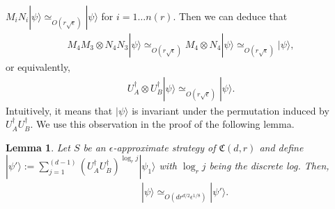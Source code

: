 \documentclass[11pt,letterpaper]{article}
\newcommand{\ket}[1]{|#1\rangle}
\newcommand{\x}{\otimes}
\newcommand{\ct}{^{\dagger}}
\newcommand{\1}{\mathbb{1}}
\newcommand{\nr}{n(r)}
\newcommand{\fC}{\mathfrak{C}}
\newcommand{\ep}{\epsilon}
\newcommand{\se}{\sqrt{\epsilon}}
\newcommand{\appd}[1]{\simeq_{#1}}
\newtheorem{lemma}[theorem]{Lemma}
\theoremstyle{definition}
\begin{document}
$M_iN_i \ket{\psi} \appd{O(r\se)} \ket{\psi}$ for $i = 1 \dots \nr$.
Then we can deduce that 
\begin{align*}
	M_4M_3 \x N_4N_3 \ket{\psi} \appd{O(r\se)} M_4 \x N_4 \ket{\psi} \appd{O(r\se)} \ket{\psi},
\end{align*}
or equivalently,
\begin{align*}
	U_A\ct \x U_B\ct \ket{\psi} \appd{O(r\se)} \ket{\psi}.
\end{align*}
Intuitively, it means that $\ket{\psi}$ is invariant under the permutation induced by $U_A\ct U_B\ct$.
We use this observation in the proof of the following lemma.
\begin{lemma}
\label{lm:decomp_psi}
Let $S$ be an $\ep$-approximate strategy of $\fC(d,r)$ and 
define 
$\ket{\psi'} := \sum_{j=1}^{(d-1)} (U_A\ct U_B\ct)^{\log_r j} \ket{\psi_1}$
with $\log_r j$ being the discrete log.
Then,
\begin{align}
	&\ket{\psi} \appd{O(d r^{d/2} \ep^{1/8})} \ket{\psi'}.
\end{align}
\end{lemma}
\end{document}
